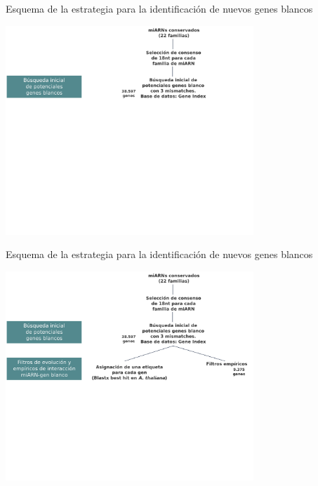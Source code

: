 \documentclass{beamer}
\begin{document}
\begin{frame}{Esquema de la estrategia para la identificación de nuevos genes blancos}
	\begin{center}
		\includegraphics[width=0.7\textwidth]{img/NAR_fig01_01.png}
	\end{center}
\end{frame}

\begin{frame}{Esquema de la estrategia para la identificación de nuevos genes blancos}
	\begin{center}
		\includegraphics[width=0.7\textwidth]{img/NAR_fig01_02.png}
	\end{center}
\end{frame}
\end{document}
